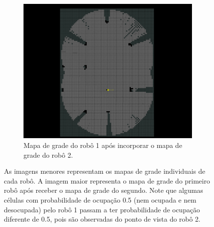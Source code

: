 \begin{figure}[]
\begin{subfigure}{0.45\textwidth}
  \end{subfigure}
  \begin{subfigure}{0.65\textwidth}
    \includegraphics[width=\textwidth]{figs/map-merge.png}
    \caption{Mapa de grade do robô 1 após incorporar o mapa de grade 
      do robô 2. }
  \end{subfigure}
  \caption{As imagens menores representam os mapas de grade 
  individuais de cada robô. A imagem maior representa o mapa de grade do
  primeiro robô após receber o mapa de grade do segundo. Note que algumas
  células com probabilidade de ocupação 0.5 (nem ocupada e nem desocupada) pelo robô 1 passam a ter probabilidade de ocupação diferente de 0.5, pois são observadas do ponto de vista do robô 2.}
  \label{fig:grid-map-exchange}
\end{figure}

